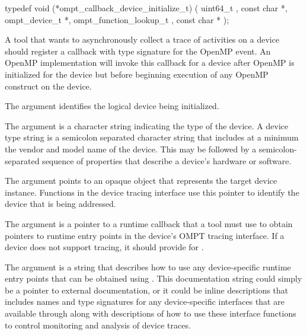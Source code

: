 \format

\begin{ccppspecific}
\begin{omptCallback}
typedef void (*ompt_callback_device_initialize_t) (
  uint64_t ,
  const char *,
  ompt_device_t *,
  ompt_function_lookup_t ,
  const char *
);
\end{omptCallback}
\end{ccppspecific}


\descr

A tool that wants to asynchronously collect a trace of
activities on a device should register a callback with type signature
 for the
 OpenMP event. An OpenMP
implementation will invoke this callback for a device after OpenMP is
initialized for the device but before beginning execution of any
OpenMP construct on the device.

\argdesc

The argument  identifies the logical device
being initialized.

The argument  is a character string indicating the
type of the device. A device type string is a semicolon separated
character string that includes at a minimum the vendor and model name
of the device. This may be followed by a semicolon-separated sequence
of properties that describe a device's hardware or software.

The  argument points to an opaque object that represents 
the target device instance. Functions in the device tracing interface 
use this pointer to identify the device that is being addressed.

The argument  is a pointer to a runtime callback
that a tool must use to obtain pointers to runtime entry points in the
device's OMPT tracing interface. If a device does not support tracing,
it should provide  for .

The argument  is a string that describes
how to use any device-specific runtime
entry points that can be obtained using . This
documentation string could simply be a pointer to external
documentation, or it could be inline descriptions
that includes names and type signatures for any
device-specific interfaces that are available through 
along with descriptions of how to use these interface functions to
control monitoring and analysis of device traces.

